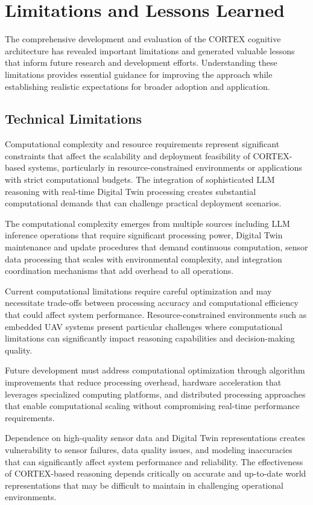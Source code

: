 \section{Limitations and Lessons Learned}

The comprehensive development and evaluation of the CORTEX cognitive architecture has revealed important limitations and generated valuable lessons that inform future research and development efforts. Understanding these limitations provides essential guidance for improving the approach while establishing realistic expectations for broader adoption and application.

\subsection{Technical Limitations}

Computational complexity and resource requirements represent significant constraints that affect the scalability and deployment feasibility of CORTEX-based systems, particularly in resource-constrained environments or applications with strict computational budgets. The integration of sophisticated LLM reasoning with real-time Digital Twin processing creates substantial computational demands that can challenge practical deployment scenarios.

The computational complexity emerges from multiple sources including LLM inference operations that require significant processing power, Digital Twin maintenance and update procedures that demand continuous computation, sensor data processing that scales with environmental complexity, and integration coordination mechanisms that add overhead to all operations.

Current computational limitations require careful optimization and may necessitate trade-offs between processing accuracy and computational efficiency that could affect system performance. Resource-constrained environments such as embedded UAV systems present particular challenges where computational limitations can significantly impact reasoning capabilities and decision-making quality.

Future development must address computational optimization through algorithm improvements that reduce processing overhead, hardware acceleration that leverages specialized computing platforms, and distributed processing approaches that enable computational scaling without compromising real-time performance requirements.

Dependence on high-quality sensor data and Digital Twin representations creates vulnerability to sensor failures, data quality issues, and modeling inaccuracies that can significantly affect system performance and reliability. The effectiveness of CORTEX-based reasoning depends critically on accurate and up-to-date world representations that may be difficult to maintain in challenging operational environments.


